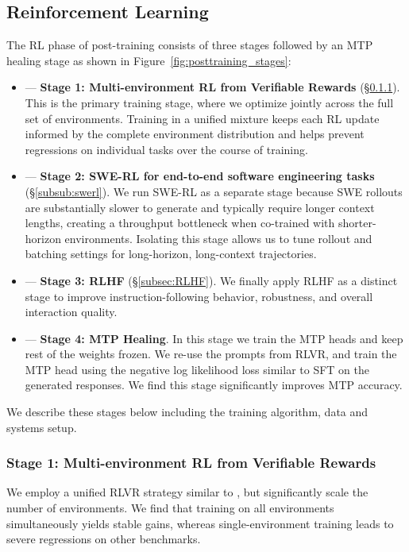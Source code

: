 \subsection{Reinforcement Learning}
\label{subsec:RL}
The RL phase of \ourmodel post-training consists of three stages followed by an MTP healing stage as shown in Figure~\ref{fig:posttraining_stages}:
\begin{itemize}
    \item[] --- \textbf{Stage 1: Multi-environment RL from Verifiable Rewards} (\S\ref{subsub:rlvr}). This is the primary training stage, where we optimize \ourmodel jointly across the full set of environments. Training in a unified mixture keeps each RL update informed by the complete environment distribution and helps prevent regressions on individual tasks over the course of training.
    \item[] --- \textbf{Stage 2: SWE-RL for end-to-end software engineering tasks} (\S\ref{subsub:swerl}). We run SWE-RL as a separate stage because SWE rollouts are substantially slower to generate and typically require longer context lengths, creating a throughput bottleneck when co-trained with shorter-horizon environments. Isolating this stage allows us to tune rollout and batching settings for long-horizon, long-context trajectories.
    \item[] --- \textbf{Stage 3: RLHF} (\S\ref{subsec:RLHF}). We finally apply RLHF as a distinct stage to improve instruction-following behavior, robustness, and overall interaction quality.
    \item[] --- \textbf{Stage 4: MTP Healing}. In this stage we train the MTP heads and keep rest of the weights frozen. We re-use the prompts from RLVR, and train the MTP head using the negative log likelihood loss similar to SFT on the generated responses. We find this stage significantly improves MTP accuracy.
\end{itemize}

We describe these stages below including the training algorithm, data and systems setup.



\subsubsection{Stage 1: Multi-environment RL from Verifiable Rewards}
\label{subsub:rlvr}

We employ a unified RLVR strategy similar to \nanomodel, but significantly scale the number of environments. We find that training on all environments simultaneously yields stable gains, whereas single-environment training leads to severe regressions on other benchmarks.

